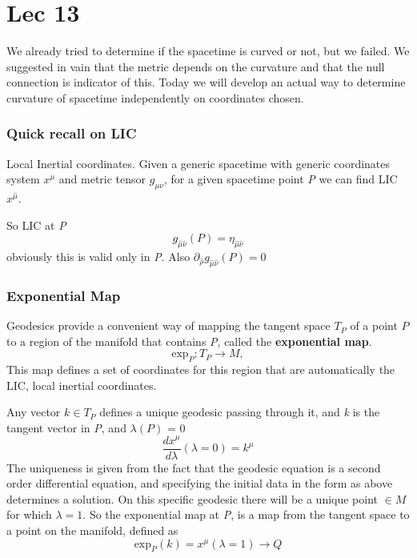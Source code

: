 \section{Lec 13}
We already tried to determine if the spacetime is curved or not, but we failed. We suggested in vain that the metric depends on the curvature and that the null connection is indicator of this.
Today we will develop an actual way to determine curvature of spacetime independently on coordinates chosen.

\subsubsection{Quick recall on LIC}
Local Inertial coordinates. Given a generic spacetime with generic coordinates system $x^{\mu }$ and metric tensor $g_{\mu \nu }$, for a given spacetime point \emph{P} we can find LIC $x^{\hat{\mu }}$. \par
So LIC at \emph{P} 
\begin{equation}
g_{\hat{\mu }\hat{\nu }} \left( P \right) = \eta _{\hat{\mu }\hat{\nu }}	
\end{equation}
obviously this is valid only in \emph{P}. Also $\partial_{\hat{\rho }} g_{\hat{\mu }\hat{\nu }} \left( P \right) = 0$

\subsubsection{Exponential Map}

Geodesics provide a convenient way of mapping the tangent space $T_{P}$ of a point $P$ to a region of the manifold that contains \emph{P}, called the \textbf{exponential map}.
\begin{equation}
	\text{exp}_{P} : T_{P} \to M,
\end{equation}
This map defines a set of coordinates for this region that are automatically the LIC, local inertial coordinates. \par 
Any vector $k \in T_{P}$ defines a unique geodesic passing through it, and \emph{k} is the tangent vector in \emph{P}, and $\lambda \left( P \right)$ = 0
\[
\frac{d x^{\mu }}{d \lambda } \left( \lambda =0 \right) =  k^{\mu }
\]
The uniqueness is given from the fact that the geodesic equation is a second order differential equation, and specifying the initial data in the form as above determines a solution. On this specific geodesic there will be a unique point $\in M$ for which $\lambda =1$.
So the exponential map at \emph{P}, is a map from the tangent space to a point on the manifold, defined as
\begin{equation}
	\text{exp}_{P}\left( k \right) = x^{\mu }\left( \lambda =1 \right) \to Q
\end{equation}

